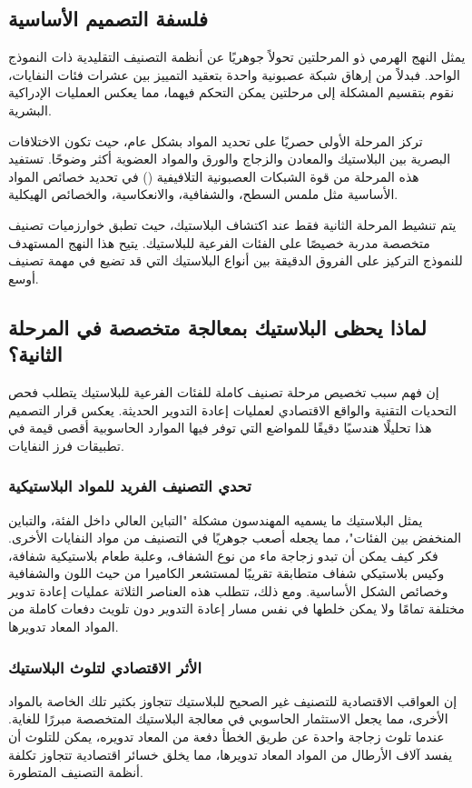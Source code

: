 \documentclass[11pt, a4paper]{article}
\begin{document}
\begin{RTL}
\section{فلسفة التصميم الأساسية}
يمثل النهج الهرمي ذو المرحلتين تحولاً جوهريًا عن أنظمة التصنيف التقليدية ذات النموذج الواحد. فبدلاً من إرهاق شبكة عصبونية واحدة بتعقيد التمييز بين عشرات فئات النفايات، نقوم بتقسيم المشكلة إلى مرحلتين يمكن التحكم فيهما، مما يعكس العمليات الإدراكية البشرية.

تركز المرحلة الأولى حصريًا على تحديد المواد بشكل عام، حيث تكون الاختلافات البصرية بين البلاستيك والمعادن والزجاج والورق والمواد العضوية أكثر وضوحًا. تستفيد هذه المرحلة من قوة الشبكات العصبونية التلافيفية () في تحديد خصائص المواد الأساسية مثل ملمس السطح، والشفافية، والانعكاسية، والخصائص الهيكلية.

يتم تنشيط المرحلة الثانية فقط عند اكتشاف البلاستيك، حيث تطبق خوارزميات تصنيف متخصصة مدربة خصيصًا على الفئات الفرعية للبلاستيك. يتيح هذا النهج المستهدف للنموذج التركيز على الفروق الدقيقة بين أنواع البلاستيك التي قد تضيع في مهمة تصنيف أوسع.

\subsection{لماذا يحظى البلاستيك بمعالجة متخصصة في المرحلة الثانية؟}
إن فهم سبب تخصيص مرحلة تصنيف كاملة للفئات الفرعية للبلاستيك يتطلب فحص التحديات التقنية والواقع الاقتصادي لعمليات إعادة التدوير الحديثة. يعكس قرار التصميم هذا تحليلًا هندسيًا دقيقًا للمواضع التي توفر فيها الموارد الحاسوبية أقصى قيمة في تطبيقات فرز النفايات.

\subsubsection{تحدي التصنيف الفريد للمواد البلاستيكية}
يمثل البلاستيك ما يسميه المهندسون مشكلة "التباين العالي داخل الفئة، والتباين المنخفض بين الفئات"، مما يجعله أصعب جوهريًا في التصنيف من مواد النفايات الأخرى. فكر كيف يمكن أن تبدو زجاجة ماء من نوع  الشفاف، وعلبة طعام بلاستيكية شفافة، وكيس بلاستيكي شفاف متطابقة تقريبًا لمستشعر الكاميرا من حيث اللون والشفافية وخصائص الشكل الأساسية. ومع ذلك، تتطلب هذه العناصر الثلاثة عمليات إعادة تدوير مختلفة تمامًا ولا يمكن خلطها في نفس مسار إعادة التدوير دون تلويث دفعات كاملة من المواد المعاد تدويرها.

\subsubsection{الأثر الاقتصادي لتلوث البلاستيك}
إن العواقب الاقتصادية للتصنيف غير الصحيح للبلاستيك تتجاوز بكثير تلك الخاصة بالمواد الأخرى، مما يجعل الاستثمار الحاسوبي في معالجة البلاستيك المتخصصة مبررًا للغاية. عندما تلوث زجاجة  واحدة عن طريق الخطأ دفعة من  المعاد تدويره، يمكن للتلوث أن يفسد آلاف الأرطال من المواد المعاد تدويرها، مما يخلق خسائر اقتصادية تتجاوز تكلفة أنظمة التصنيف المتطورة.


\end{RTL}
\end{document}
